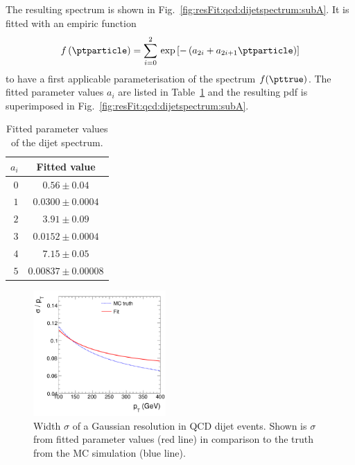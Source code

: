 \documentclass[a4paper]{cmspaper} %
\begin{document}
The resulting \ptparticle spectrum is shown in Fig.~\ref{fig:resFit:qcd:dijetspectrum:subA}.
It is fitted with an empiric function
\begin{equation}
  \label{eq:resFit:qcd:ptGenSpectrum}
  f\left(\ptparticle\right) = \sum^{2}_{i=0}\,\exp\left[-\left(a_{2i} + a_{2i+1}\ptparticle\right)\right]
\end{equation}
to have a first applicable parameterisation of the spectrum $f(\pttrue)$.
The fitted parameter values $a_{i}$ are listed in Table~\ref{tab:resFit:qcd:dijetspectrum} and the resulting pdf is superimposed in Fig.~\ref{fig:resFit:qcd:dijetspectrum:subA}.
\begin{table}[ht]
  \centering
  \begin{tabular}{rc}
    \hline
    \hline
    $a_{i}$ & Fitted value \\
    \hline
    $0$ & $0.56 \pm 0.04$ \\
    $1$ & $0.0300 \pm 0.0004$ \\
    $2$ & $3.91 \pm 0.09$ \\
    $3$ & $0.0152 \pm 0.0004$ \\
    $4$ & $7.15 \pm 0.05$ \\
    $5$ & $0.00837 \pm 0.00008$ \\
    \hline
    \hline
  \end{tabular}
 \caption{Fitted parameter values of the dijet \ptparticle spectrum.}
  \label{tab:resFit:qcd:dijetspectrum}
\end{table}

\begin{figure}[ht]
  \centering
  \includegraphics[width=0.45\textwidth]{figures/resFit_PtDependentSigma}
  \caption{Width $\sigma$ of a Gaussian resolution in QCD dijet events. Shown is $\sigma$ from fitted parameter values (red line) in comparison to the truth from the MC simulation (blue line).}
  \label{fig:resFit:qcd:ptDependentSigma}
\end{figure}
\end{document}
